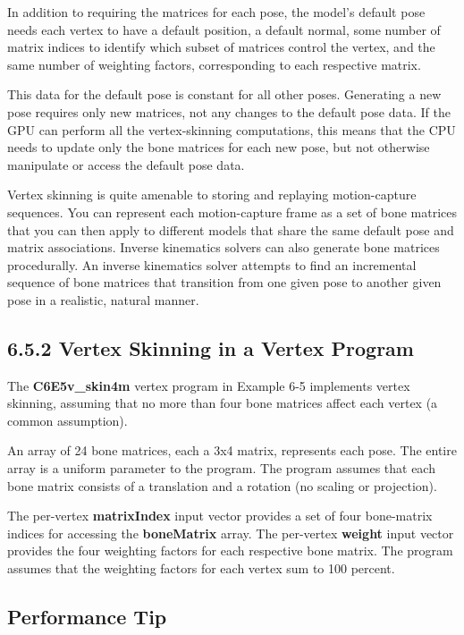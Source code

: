 \documentclass[../main.tex]{subfiles}
\begin{document}
In addition to requiring the matrices for each pose, the model's default pose needs each vertex to have a default position, a default normal, some number of matrix indices to identify which subset of matrices control the vertex, and the same number of weighting factors, corresponding to each respective matrix.

This data for the default pose is constant for all other poses. Generating a new pose requires only new matrices, not any changes to the default pose data. If the GPU can perform all the vertex-skinning computations, this means that the CPU needs to update only the bone matrices for each new pose, but not otherwise manipulate or access the default pose data.

Vertex skinning is quite amenable to storing and replaying motion-capture sequences. You can represent each motion-capture frame as a set of bone matrices that you can then apply to different models that share the same default pose and matrix associations. Inverse kinematics solvers can also generate bone matrices procedurally. An inverse kinematics solver attempts to find an incremental sequence of bone matrices that transition from one given pose to another given pose in a realistic, natural manner.

\subsection{6.5.2 Vertex Skinning in a Vertex Program}

The \textbf{C6E5v_skin4m} vertex program in Example 6-5 implements vertex skinning, assuming that no more than four bone matrices affect each vertex (a common assumption).

An array of 24 bone matrices, each a 3x4 matrix, represents each pose. The entire array is a uniform parameter to the program. The program assumes that each bone matrix consists of a translation and a rotation (no scaling or projection).

The per-vertex \textbf{matrixIndex} input vector provides a set of four bone-matrix indices for accessing the \textbf{boneMatrix} array. The per-vertex \textbf{weight} input vector provides the four weighting factors for each respective bone matrix. The program assumes that the weighting factors for each vertex sum to 100 percent.

\subsection*{Performance Tip}
\end{document}
